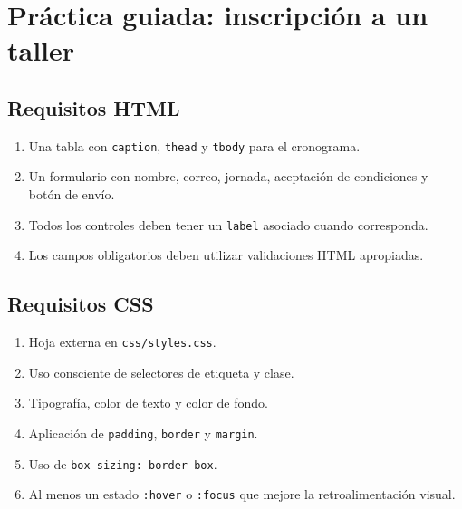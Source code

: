 \documentclass[11pt]{article}
\begin{document}

\section{Práctica guiada: inscripción a un taller}


\subsection{Requisitos HTML}
\begin{enumerate}
    \item Una tabla con \texttt{caption}, \texttt{thead} y \texttt{tbody} para el cronograma.
    \item Un formulario con nombre, correo, jornada, aceptación de condiciones y botón de envío.
    \item Todos los controles deben tener un \texttt{label} asociado cuando corresponda.
    \item Los campos obligatorios deben utilizar validaciones HTML apropiadas.
\end{enumerate}

\subsection{Requisitos CSS}
\begin{enumerate}
    \item Hoja externa en \texttt{css/styles.css}.
    \item Uso consciente de selectores de etiqueta y clase.
    \item Tipografía, color de texto y color de fondo.
    \item Aplicación de \texttt{padding}, \texttt{border} y \texttt{margin}.
    \item Uso de \texttt{box-sizing: border-box}.
    \item Al menos un estado \texttt{:hover} o \texttt{:focus} que mejore la retroalimentación visual.
\end{enumerate}

\begin{center}
\end{center}
\end{document}
